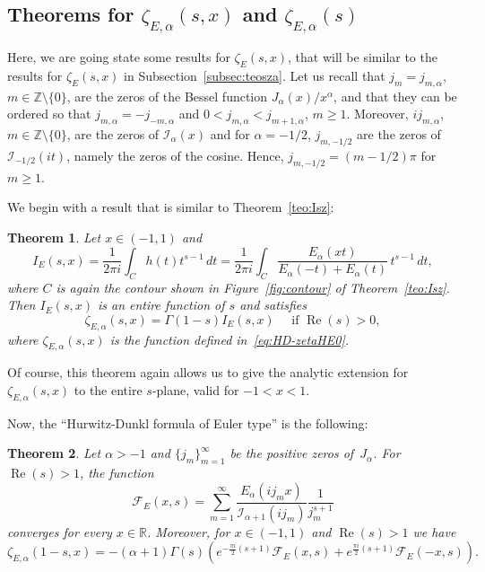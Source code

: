 \documentclass[a4paper]{amsart}
\newcommand{\Z}{\mathbb{Z}}
\newcommand{\R}{\mathbb{R}}
\newcommand{\I}{\mathcal{I}}
\newcommand{\Ea}{E_{\alpha}}
\renewcommand{\Re}{\operatorname{Re}}
\theoremstyle{plain}
\newtheorem{theorem}{Theorem}[section]
\theoremstyle{definition}
\theoremstyle{remark}
\numberwithin{equation}{section}
\begin{document}
\subsection{Theorems for $\zeta_{E,\alpha}(s,x)$ and $\zeta_{E,\alpha}(s)$}
\label{subsec:teoszEa}

Here, we are going state some results for $\zeta_E(s,x)$, that will be similar to the results for $\zeta_E(s,x)$ in Subsection~\ref{subsec:teosza}.
Let us recall that $j_m = j_{m,\alpha}$, $m\in \Z\setminus\{0\}$, are the zeros of the Bessel function $J_{\alpha}(x)/x^{\alpha}$, and that they can be ordered so that $j_{m,\alpha} = -j_{-m,\alpha}$ and $0< j_{m,\alpha} < j_{m+1,\alpha}$, $m\ge 1$. Moreover, $i j_{m,\alpha}$, $m \in \Z \setminus \{0\}$, are the zeros of $\I_{\alpha}(x)$ and for $\alpha=-1/2$, $j_{m,-1/2}$ are the zeros of $\I_{-1/2}(it)$, namely the zeros of the cosine. Hence, $ j_{m,-1/2} = (m - 1/2) \pi$ for $m \ge 1$.

We begin with a result that is similar to Theorem~\ref{teo:Isz}:

\begin{theorem}
\label{teo:IEsz}
Let $x\in(-1,1)$ and 
\[
I_E(s,x) = \frac{1}{2\pi i}\int_{C} h(t) t^{s-1}\,dt 
= \frac{1}{2\pi i}\int_C \frac{\Ea(xt)}{\Ea(-t)+\Ea(t)} \,t^{s-1}\,dt,
\]
where $C$ is again the contour shown in Figure~\ref{fig:contour} of Theorem~\ref{teo:Isz}.
Then $I_E(s,x)$ is an entire function of $s$ and satisfies 
\begin{equation*}
\zeta_{E,\alpha}(s,x) = \Gamma(1-s)I_E(s,x) \quad \text{ if } \Re(s)>0,
\end{equation*}
where $\zeta_{E,\alpha}(s,x)$ is the function defined in~\eqref{eq:HD-zetaHE0}.
\end{theorem}

Of course, this theorem again allows us to give the analytic extension for $\zeta_{E,\alpha}(s,x)$ to the entire $s$-plane, valid for $-1<x<1$. 

Now, the ``Hurwitz-Dunkl formula of Euler type'' is the following:

\begin{theorem}
\label{teo:HD-form-E}
Let $\alpha>-1$ and $\{j_m\}_{m=1}^{\infty}$ be the positive zeros of~$J_\alpha$. 
For $\Re(s)>1$, the function
\[
\mathcal{F}_E(x,s) = \sum_{m=1}^{\infty} 
\frac{\Ea( i j_m x)}{\I_{\alpha+1}(i j_m)} \frac{1}{j_m^{s+1}}
\]
converges for every $x \in \R$.
Moreover, for $x \in (-1,1)$ and $\Re(s)>1$ we have
\begin{equation}
\label{eq:form-HD-Euler}
  \zeta_{E,\alpha}(1-s,x) = -(\alpha+1)\Gamma(s)
  \left( e^{-\frac{\pi i}{2}(s+1)} \mathcal{F}_E(x,s) 
  + e^{\frac{\pi i}{2}(s+1)} \mathcal{F}_E(-x,s)\right).
\end{equation}
\end{theorem}
\end{document}
